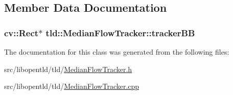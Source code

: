 \subsection{Member Data Documentation}
\hypertarget{classtld_1_1_median_flow_tracker_a254c6f56a5b4567357321acc5a36b844}{
\subsubsection[{trackerBB}]{\setlength{\rightskip}{0pt plus 5cm}cv::Rect$\ast$ {\bf tld::MedianFlowTracker::trackerBB}}}
\label{classtld_1_1_median_flow_tracker_a254c6f56a5b4567357321acc5a36b844}


The documentation for this class was generated from the following files:\begin{DoxyCompactItemize}
\item 
src/libopentld/tld/\hyperlink{_median_flow_tracker_8h}{MedianFlowTracker.h}\item 
src/libopentld/tld/\hyperlink{_median_flow_tracker_8cpp}{MedianFlowTracker.cpp}\end{DoxyCompactItemize}
